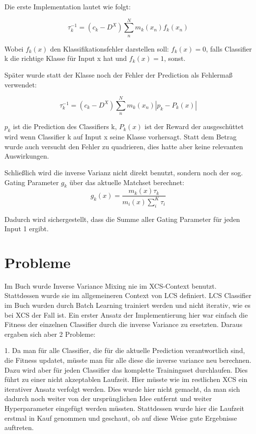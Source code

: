 \documentclass{ocsmnar}
\begin{document}
Die erste Implementation lautet wie folgt: 

$$ \tau_{k}^{-1} = (c_{k} - D^{X}) \sum_{n}^{N} m_{k}(x_{n})f_{k}(x_{n}) $$

Wobei $f_{k}(x)$ den Klassifikationsfehler darstellen soll: $f_{k}(x) = 0$, falls Classifier k die richtige Klasse für Input x hat und $f_{k}(x) = 1$, sonst. 

Später wurde statt der Klasse noch der Fehler der Prediction als Fehlermaß verwendet:

$$ \tau_{k}^{-1} = (c_{k} - D^{X}) \sum_{n}^{N} m_{k}(x_{n}) |p_{k} - P_{k}(x)|  $$

$p_{k}$ ist die Prediction des Classifiers k, $P_{k}(x)$ ist der Reward der ausgeschüttet wird wenn Classifier k auf Input x seine Klasse vorhersagt. 
Statt dem Betrag wurde auch versucht den Fehler zu quadrieren, dies hatte aber keine relevanten Auswirkungen.

Schließlich wird die inverse Varianz nicht direkt benutzt, sondern noch der sog. Gating Parameter $g_{k}$ über das aktuelle Matchset berechnet: 
$$ g_k(x) = \frac{m_k(x)\tau_k}{m_i(x)\sum_i^K \tau_i}$$

Dadurch wird sichergestellt, dass die Summe aller Gating Parameter für jeden Input 1 ergibt. 




\section{Probleme}
Im Buch wurde Inverse Variance Mixing nie im XCS-Context benutzt. Stattdessen wurde sie im allgemeineren Context von LCS definiert. LCS Classifier im Buch wurden durch Batch Learning trainiert werden und nicht iterativ, wie es bei XCS der Fall ist. 
Ein erster Ansatz der Implementierung hier war einfach die Fitness der einzelnen Classifier durch die inverse Variance zu ersetzten. 
Daraus ergaben sich aber 2 Probleme: 

1. Da man für alle Classifier, die für die aktuelle Prediction verantwortlich sind, die Fitness updatet, müsste man für alle diese die inverse variance neu berechnen. Dazu wird aber für jeden Classifier das komplette Trainingsset durchlaufen. Dies führt zu einer nicht akzeptablen Laufzeit. Hier müsste wie im restlichen XCS ein iterativer Ansatz verfolgt werden. Dies wurde hier nicht gemacht, da man sich dadurch noch weiter von der ursprünglichen Idee entfernt und weiter Hyperparameter eingefügt werden müssten. 
Stattdessen wurde hier die Laufzeit erstmal in Kauf genommen und geschaut, ob auf diese Weise gute Ergebnisse auftreten.  
\end{document}
